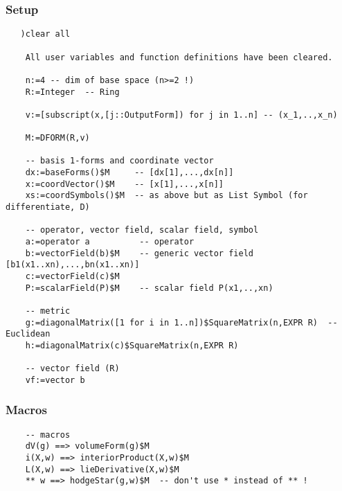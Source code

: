 \documentclass[12pt,a4paper]{article}
\begin{document}
\subsubsection{Setup}
\begin{lstlisting}   
   )clear all
 
    All user variables and function definitions have been cleared.
  
    n:=4 -- dim of base space (n>=2 !)
    R:=Integer  -- Ring
 
    v:=[subscript(x,[j::OutputForm]) for j in 1..n] -- (x_1,..,x_n)
 
    M:=DFORM(R,v)
 
    -- basis 1-forms and coordinate vector
    dx:=baseForms()$M     -- [dx[1],...,dx[n]]
    x:=coordVector()$M    -- [x[1],...,x[n]]
    xs:=coordSymbols()$M  -- as above but as List Symbol (for differentiate, D)
 
    -- operator, vector field, scalar field, symbol
    a:=operator a          -- operator
    b:=vectorField(b)$M    -- generic vector field [b1(x1..xn),...,bn(x1..xn)]
    c:=vectorField(c)$M
    P:=scalarField(P)$M    -- scalar field P(x1,..,xn)
 
    -- metric
    g:=diagonalMatrix([1 for i in 1..n])$SquareMatrix(n,EXPR R)  -- Euclidean
    h:=diagonalMatrix(c)$SquareMatrix(n,EXPR R)
 
    -- vector field (R)
    vf:=vector b

\end{lstlisting}
%
\subsubsection{Macros} 
\begin{lstlisting}  
    -- macros
    dV(g) ==> volumeForm(g)$M 
    i(X,w) ==> interiorProduct(X,w)$M  
    L(X,w) ==> lieDerivative(X,w)$M
    ** w ==> hodgeStar(g,w)$M  -- don't use * instead of ** !
\end{lstlisting} 
%
\end{document}
